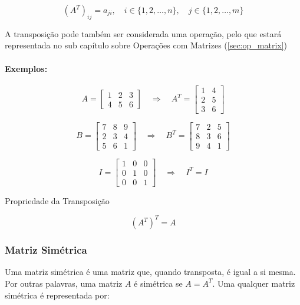 \[
    {\left( A^{T} \right)}_{ij} = a_{ji}, \quad i \in \{1,2, \dots, n\}, \quad j \in \{1,2, \dots, m\}
\]

A transposição pode também ser considerada uma operação, pelo que estará representada no sub capítulo sobre Operações com Matrizes (\ref{sec:op_matrix})

\paragraph{Exemplos:}

\[
    A =
    \begin{bmatrix}
        1 & 2 & 3 \\
        4 & 5 & 6
    \end{bmatrix}
    \quad \Rightarrow \quad
    A^T =
    \begin{bmatrix}
        1 & 4 \\
        2 & 5 \\
        3 & 6
    \end{bmatrix}
\]

\[
    B =
    \begin{bmatrix}
        7 & 8 & 9 \\
        2 & 3 & 4 \\
        5 & 6 & 1
    \end{bmatrix}
    \quad \Rightarrow \quad
    B^T =
    \begin{bmatrix}
        7 & 2 & 5 \\
        8 & 3 & 6 \\
        9 & 4 & 1
    \end{bmatrix}
\]

\[
    I =
    \begin{bmatrix}
        1 & 0 & 0 \\
        0 & 1 & 0 \\
        0 & 0 & 1
    \end{bmatrix}
    \quad \Rightarrow \quad
    I^T = I
\]

\begin{center}
    Propriedade da Transposição
\end{center}
\[
    {\left( A^T \right)}^T = A
\]

\subsubsection{Matriz Simétrica}
\indent

Uma matriz simétrica é uma matriz que, quando transposta, é igual a si mesma. Por outras palavras, uma matriz $A$ é simétrica se $A = A^T$. Uma qualquer matriz simétrica é representada por:

